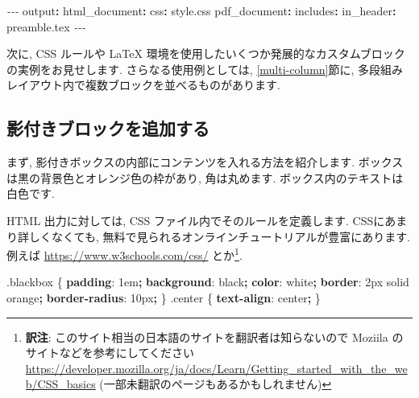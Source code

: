 \documentclass[
  11pt,
  lualatex,ja=standard,jafont=noto]{bxjsreport}
\newenvironment{Shaded}{\begin{snugshade}}{\end{snugshade}}
\newcommand{\AttributeTok}[1]{\textcolor[rgb]{0.77,0.63,0.00}{#1}}
\newcommand{\ConstantTok}[1]{\textcolor[rgb]{0.00,0.00,0.00}{#1}}
\newcommand{\DataTypeTok}[1]{\textcolor[rgb]{0.13,0.29,0.53}{#1}}
\newcommand{\DecValTok}[1]{\textcolor[rgb]{0.00,0.00,0.81}{#1}}
\newcommand{\FunctionTok}[1]{\textcolor[rgb]{0.00,0.00,0.00}{#1}}
\newcommand{\KeywordTok}[1]{\textcolor[rgb]{0.13,0.29,0.53}{\textbf{#1}}}
\newcommand{\NormalTok}[1]{#1}
\newcommand{\OperatorTok}[1]{\textcolor[rgb]{0.81,0.36,0.00}{\textbf{#1}}}
\newcommand{\PreprocessorTok}[1]{\textcolor[rgb]{0.56,0.35,0.01}{\textit{#1}}}
\begin{document}
\begin{Shaded}
\begin{Highlighting}[]
\PreprocessorTok{{-}{-}{-}}
\FunctionTok{output}\KeywordTok{:}
\AttributeTok{  }\FunctionTok{html\_document}\KeywordTok{:}
\AttributeTok{    }\FunctionTok{css}\KeywordTok{:}\AttributeTok{ style.css}
\AttributeTok{  }\FunctionTok{pdf\_document}\KeywordTok{:}
\AttributeTok{    }\FunctionTok{includes}\KeywordTok{:}
\AttributeTok{      }\FunctionTok{in\_header}\KeywordTok{:}\AttributeTok{ preamble.tex}
\PreprocessorTok{{-}{-}{-}}
\end{Highlighting}
\end{Shaded}

次に, CSS ルールや LaTeX 環境を使用したいくつか発展的なカスタムブロックの実例をお見せします. さらなる使用例としては, \ref{multi-column}節に, 多段組みレイアウト内で複数ブロックを並べるものがあります.

\hypertarget{block-shaded}{%
\subsection{影付きブロックを追加する}\label{block-shaded}}

まず, 影付きボックスの内部にコンテンツを入れる方法を紹介します. ボックスは黒の背景色とオレンジ色の枠があり, 角は丸めます. ボックス内のテキストは白色です.

HTML 出力に対しては, CSS ファイル内でそのルールを定義します. CSSにあまり詳しくなくても, 無料で見られるオンラインチュートリアルが豊富にあります. 例えば \url{https://www.w3schools.com/css/} とか\footnote{\textbf{訳注}: このサイト相当の日本語のサイトを翻訳者は知らないので Moziila のサイトなどを参考にしてください \url{https://developer.mozilla.org/ja/docs/Learn/Getting_started_with_the_web/CSS_basics} (一部未翻訳のページもあるかもしれません)}.

\begin{Shaded}
\begin{Highlighting}[numbers=left,,]
\FunctionTok{.blackbox}\NormalTok{ \{}
  \KeywordTok{padding}\NormalTok{: }\DecValTok{1}\DataTypeTok{em}\OperatorTok{;}
  \KeywordTok{background}\NormalTok{: }\ConstantTok{black}\OperatorTok{;}
  \KeywordTok{color}\NormalTok{: }\ConstantTok{white}\OperatorTok{;}
  \KeywordTok{border}\NormalTok{: }\DecValTok{2}\DataTypeTok{px} \DecValTok{solid} \ConstantTok{orange}\OperatorTok{;}
  \KeywordTok{border{-}radius}\NormalTok{: }\DecValTok{10}\DataTypeTok{px}\OperatorTok{;}
\NormalTok{\}}
\FunctionTok{.center}\NormalTok{ \{}
  \KeywordTok{text{-}align}\NormalTok{: }\DecValTok{center}\OperatorTok{;}
\NormalTok{\}}
\end{Highlighting}
\end{Shaded}
\end{document}
